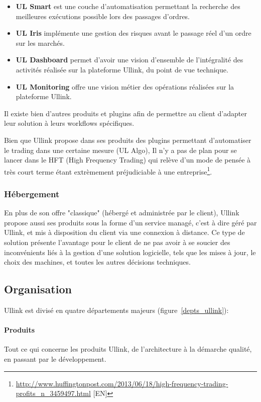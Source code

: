 \documentclass[a4paper, 12pt]{article}
\begin{document}
\begin{itemize}
\item{\textbf{UL Smart} est une couche d'automatisation permettant la recherche des meilleures exécutions possible lors des passages d'ordres.}
\item{\textbf{UL Iris} implémente une gestion des risques avant le passage réel d'un ordre sur les marchés.}
\item{\textbf{UL Dashboard} permet d'avoir une vision d'ensemble de l'intégralité des activités réalisée sur la plateforme Ullink, du point de vue technique.}
\item{\textbf{UL Monitoring} offre une vision métier des opérations réalisées sur la plateforme Ullink.}
\end{itemize}

Il existe bien d'autres produits et plugins afin de permettre au client d'adapter leur solution à leurs workflows spécifiques.

Bien que Ullink propose dans ses produits des plugins permettant d'automatiser le trading dans une certaine mesure (UL Algo), Il n'y a pas de plan pour se lancer dans le HFT (High Frequency Trading) qui relève d'un mode de pensée à très court terme étant extrèmement préjudiciable à une entreprise\footnote{\url{http://www.huffingtonpost.com/2013/06/18/high-frequency-trading-profits_n_3459497.html} [EN]}.

\subsubsection{Hébergement}

En plus de son offre "classique" (hébergé et administrée par le client), Ullink propose aussi ses produits sous la forme d'un service managé, c'est à dire géré par Ullink, et mis à disposition du client via une connexion à distance. Ce type de solution présente l'avantage pour le client de ne pas avoir à se soucier des inconvénients liés à la gestion d'une solution logicielle, tels que les mises à jour, le choix des machines, et toutes les autres décisions techniques.

\subsection{Organisation}

Ullink est divisé en quatre départements majeurs (figure~\ref{depts_ullink}):

\paragraph{Produits}
Tout ce qui concerne les produits Ullink, de l'architecture à la démarche qualité, en passant par le développement.
\end{document}
